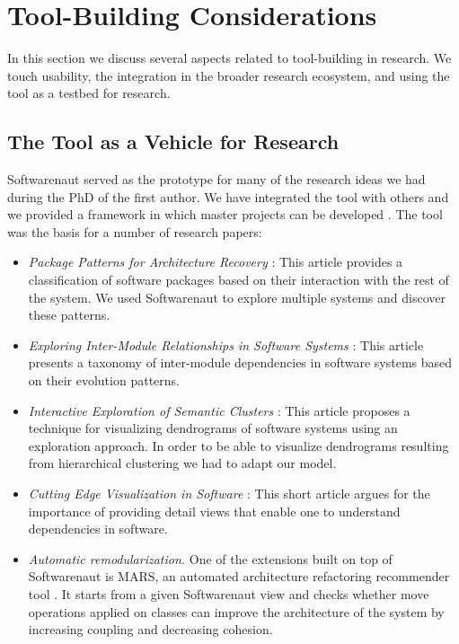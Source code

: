 \documentclass[preprint,12pt]{elsarticle}
\begin{document}
\section {Tool-Building Considerations} \label {sec:disc}

In this section we discuss several aspects related to tool-building in research. We touch usability, the integration in the broader research ecosystem, and using the tool as a testbed for research.


\subsection {The Tool as a Vehicle for Research}
Softwarenaut served as the prototype for many of the research ideas we had during the PhD of the first author. We have integrated the tool with others \cite{lungu-clust, lungu-scico, nier-story} and we provided a framework in which master projects can be developed \cite{boeckmann-mars}. %
The tool was the basis for a number of research papers: 
\begin{itemize}
\item {\em Package Patterns for Architecture Recovery} \cite{lungu-packages}: This article provides a classification of software packages based on their interaction with the rest of the system. We used Softwarenaut to explore multiple systems and discover these patterns.
\item {\em Exploring Inter-Module Relationships in Software Systems} \cite{lungu-relevo}: This article presents a taxonomy of inter-module dependencies in software systems based on their evolution patterns.
\item {\em Interactive Exploration of Semantic Clusters} \cite{lungu-clust}: This article proposes a technique for visualizing dendrograms of software systems using an exploration approach. In order to be able to visualize {dendrograms} resulting from hierarchical clustering we had to adapt our model.
\item {\em Cutting Edge Visualization in Software} \cite{lungu-cutedge}: This short article argues for the importance of providing detail views that enable one to understand dependencies in software.
\item {\em Automatic remodularization.} One of the extensions built on top of Softwarenaut is MARS, an automated architecture refactoring recommender tool \cite{boeckmann-mars}. It starts from a given Softwarenaut view and checks whether move operations applied on classes can improve the architecture of the system by increasing coupling and decreasing cohesion. %

\end{itemize}
\end{document}
